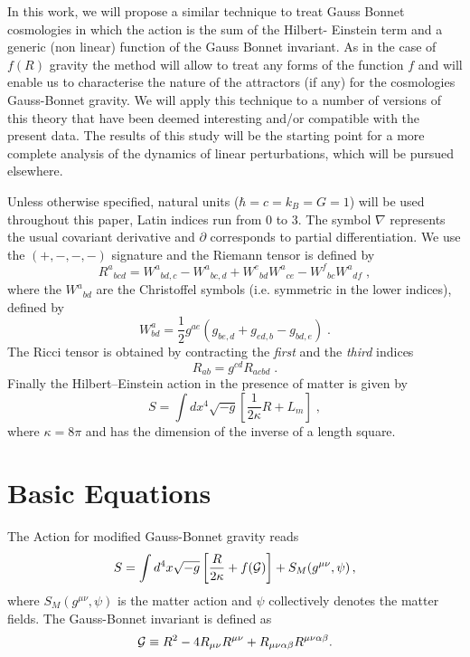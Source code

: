 \documentclass[a4paper,aps,onecolumn,nofootinbib]{revtex4}
\begin{document}
In this work, we will propose a similar technique to treat Gauss Bonnet cosmologies in which the action is the sum of the Hilbert- Einstein  term and a generic (non linear) function of the Gauss Bonnet invariant. As in the case of $f(R)$ gravity the method will allow to treat any forms of the function $f$ and will enable us to characterise the nature of the attractors (if any) for the cosmologies Gauss-Bonnet gravity. We will apply this technique to a number of versions of this theory that have been deemed interesting and/or compatible  with the present data. The results of { this} study will be the starting point for a more complete analysis of the dynamics of linear perturbations, which will be pursued elsewhere.

Unless otherwise specified, natural units ($\hbar=c=k_{B}=G=1$)
will be used throughout this paper, Latin indices run from 0 to 3.
The symbol $\nabla$ represents the usual covariant derivative and
$\partial$ corresponds to partial differentiation. We use the
$(+,-,-,-)$ signature and the Riemann tensor is defined by
\begin{equation}
R^{a}{}_{bcd}=W^a{}_{bd,c}-W^a{}_{bc,d}+ W^e{}_{bd}W^a{}_{ce}-
W^f{}_{bc}W^a{}_{df}\;,
\end{equation}
where the $W^a{}_{bd}$ are the Christoffel symbols (i.e. symmetric in
the lower indices), defined by
\begin{equation}
W^a_{bd}=\frac{1}{2}g^{ae}
\left(g_{be,d}+g_{ed,b}-g_{bd,e}\right)\;.
\end{equation}
The Ricci tensor is obtained by contracting the {\em first} and the
{\em third} indices
\begin{equation}\label{Ricci}
R_{ab}=g^{cd}R_{acbd}\;.
\end{equation}
Finally the Hilbert--Einstein action in the presence of matter is
given by
\begin{equation}
S=\int d x^{4} \sqrt{-g}\left[\frac{1}{2\kappa}R+ L_{m}\right]\;,
\end{equation}
where $\kappa =8\pi$ and has the dimension of the inverse of a length square.

\section{Basic Equations}
The Action for modified Gauss-Bonnet gravity reads 
\begin{equation}
S=\int d^4x \sqrt{-g}\left[\frac{R}{2\kappa}+f({\cal G})\right]+S_M(g^{\mu\nu},\psi)\,,
   \label{modGBaction}
\end{equation}
where $S_M(g^{\mu\nu},\psi)$ is the matter
action and $\psi$ collectively denotes the matter
fields. The Gauss-Bonnet invariant is defined as
\begin{equation}
{\cal G}\equiv
R^2-4R_{\mu\nu}R^{\mu\nu}+R_{\mu\nu\alpha\beta}R^{\mu\nu\alpha\beta}.
\end{equation}
\end{document}

